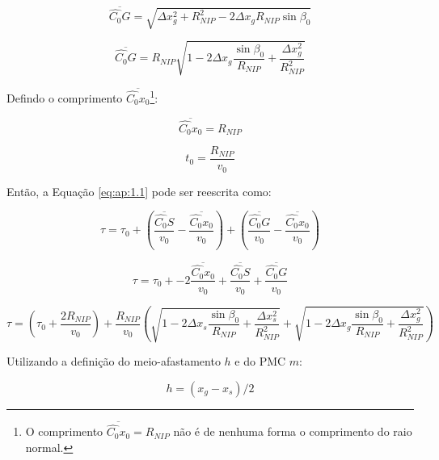 \begin{equation}
 \label{eq:ap:1.18}
 \overline{\hat{C_0}G} = \sqrt{ \Delta x_{g}^2 + R_{NIP}^2 - 2 \Delta x_g R_{NIP} \sin{\beta_0} }
\end{equation}

\begin{equation}
 \label{eq:ap:1.19}
 \overline{\hat{C_0}G} = 
 R_{NIP} \sqrt{  1 - 2 \Delta x_g \frac{\sin{\beta_0}}{R_{NIP}} + \frac{\Delta x_{g}^2}{R_{NIP}^2} }
\end{equation}

Defindo o comprimento $\overline{\hat{C_0}x_0}$\footnote{O comprimento
$\overline{\hat{C_0}x_0} = R_{NIP}$ não é de nenhuma forma o comprimento do raio normal.}:

\begin{equation}
 \label{eq:ap:1.20}
 \overline{\hat{C_0}x_0} = R_{NIP}
\end{equation}

\begin{equation}
 \label{eq:ap:1.21}
t_0 = \frac{R_{NIP}}{v_0}
\end{equation}

Então, a Equação \ref{eq:ap:1.1} pode ser reescrita como:

\begin{equation}
 \label{eq:ap:1.22}
\tau = \tau_0 + \left( \frac{\overline{\hat{C_0}S}}{v_0} - \frac{\overline{\hat{C_0}x_0}}{v_0} \right)
+ \left( \frac{\overline{\hat{C_0}G}}{v_0} - \frac{\overline{\hat{C_0}x_0}}{v_0} \right)
\end{equation}

\begin{equation}
 \label{eq:ap:1.23}
\tau = \tau_0 + - 2 \frac{\overline{\hat{C_0}x_0}}{v_0} + \frac{\overline{\hat{C_0}S}}{v_0}
+ \frac{\overline{\hat{C_0}G}}{v_0}
\end{equation}

\begin{equation}
 \label{eq:ap:1.24}
\tau = \left( \tau_0 + \frac{2 R_{NIP}}{v_0} \right)
+ \frac{R_{NIP}}{v_0} \left( \sqrt{  1 - 2 \Delta x_s \frac{\sin{\beta_0}}{R_{NIP}} + \frac{\Delta x_{s}^2}{R_{NIP}^2} }
+ \sqrt{  1 - 2 \Delta x_g \frac{\sin{\beta_0}}{R_{NIP}} + \frac{\Delta x_{g}^2}{R_{NIP}^2} } \right)
\end{equation}

Utilizando a definição do meio-afastamento $h$ e do PMC $m$: 

\begin{equation}
 \label{eq:ap:1.25}
 h=(x_g-x_s)/2
\end{equation}

